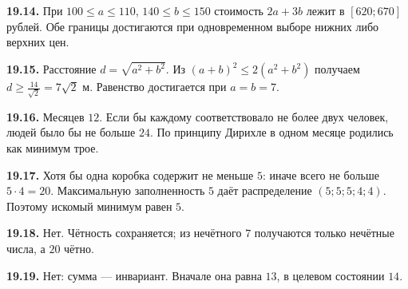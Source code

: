 \documentclass[12pt,a4paper,oneside,openany]{book}
\theoremstyle{colordef}\newtheorem{definition}{Определение}[chapter]
\theoremstyle{plain}\newtheorem{theorem}{Теорема}[chapter]
\theoremstyle{definition}\newtheorem{axiom}{Аксиома}[chapter]
\begin{document}
\textbf{19.14.} При \(100\le a\le110\), \(140\le b\le150\) стоимость \(2a+3b\) лежит в \([620;670]\) рублей. Обе границы достигаются при одновременном выборе нижних либо верхних цен.\par
\textbf{19.15.} Расстояние \(d=\sqrt{a^2+b^2}\). Из \((a+b)^2\le2(a^2+b^2)\) получаем \(d\ge\frac{14}{\sqrt2}=7\sqrt2\) м. Равенство достигается при \(a=b=7\).\par
\textbf{19.16.} Месяцев \(12\). Если бы каждому соответствовало не более двух человек, людей было бы не больше \(24\). По принципу Дирихле в одном месяце родились как минимум трое.\par
\textbf{19.17.} Хотя бы одна коробка содержит не меньше \(5\): иначе всего не больше \(5\cdot4=20\). Максимальную заполненность \(5\) даёт распределение \((5;5;5;4;4)\). Поэтому искомый минимум равен \(5\).\par
\textbf{19.18.} Нет. Чётность сохраняется; из нечётного \(7\) получаются только нечётные числа, а \(20\) чётно.\par
\textbf{19.19.} Нет: сумма — инвариант. Вначале она равна \(13\), в целевом состоянии \(14\).\par
\end{document}
